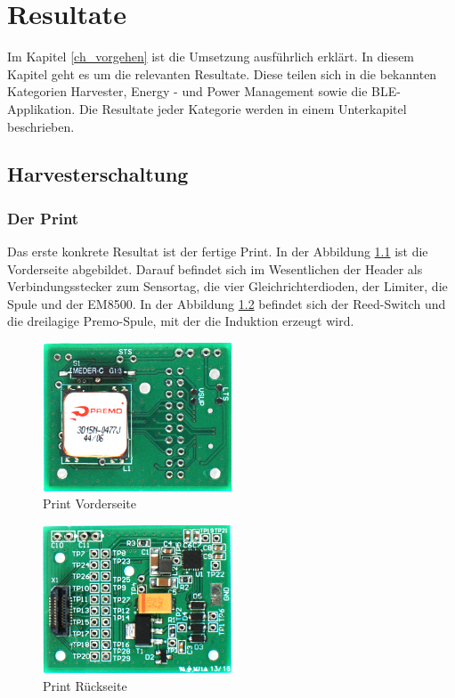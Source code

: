 \chapter{Resultate}
\label{ch_resultat}

Im Kapitel \ref{ch_vorgehen} ist die Umsetzung ausführlich erklärt. In diesem Kapitel geht es um die relevanten Resultate. Diese teilen sich in die bekannten Kategorien Harvester, Energy - und Power Management sowie die BLE-Applikation. Die Resultate jeder Kategorie werden in einem Unterkapitel beschrieben.
 
\section{Harvesterschaltung}

\subsection{Der Print}

Das erste konkrete Resultat ist der fertige Print. In der Abbildung \ref{print_vorne} ist die Vorderseite abgebildet.  Darauf befindet sich im Wesentlichen der Header als Verbindungsstecker zum Sensortag, die vier Gleichrichterdioden, der Limiter, die Spule und der EM8500. In der Abbildung \ref{print_rueckseite} befindet sich der Reed-Switch und die dreilagige Premo-Spule, mit der die Induktion erzeugt wird.

\begin{figure}[ht]
    \includegraphics[width=0.5\textwidth]{4Resultate/imag/print_rueckseite.png} 
    \caption{Print Vorderseite}
    \label{print_vorne}
\end{figure}


\begin{figure}[ht]
    \includegraphics[width=0.5\textwidth]{4Resultate/imag/print_vorne.png} 
    \caption{Print Rückseite}
    \label{print_rueckseite}
\end{figure}

